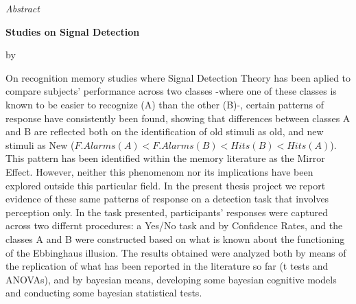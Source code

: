 \documentclass[
12pt, %
spanish, %
onehalfspacing, %
headsepline, %
]{MastersDoctoralThesis} %
\begin{document}
\cleardoublepage
\vspace*{0.15\textheight}
\begin{center}
	{\huge\textit{Abstract} \par}
	\bigskip
	\bigskip
	{\normalsize\bfseries Studies on Signal Detection \par} %
	\medskip
	{\normalsize by \authorname \par} %
	\bigskip
\end{center}
On recognition memory studies where Signal Detection Theory has been aplied to compare subjects' performance across two classes -where one of these classes is known to be easier to recognize (A) than the other (B)-, certain patterns of response have consistently been found, showing that differences between classes A and B are reflected both on the identification of old stimuli as old, and new stimuli as New ($F.Alarms(A) < F.Alarms (B) < Hits(B) < Hits(A)$). This pattern has been identified within the memory literature as the Mirror Effect. However, neither this phenomenom nor its implications have been explored outside this particular field. In the present thesis project we report evidence of these same patterns of response on a detection task that involves perception only. In the task presented, participants' responses were captured across two differnt procedures: a Yes/No task and by Confidence Rates, and the classes A and B were constructed based on what is known about the functioning of the Ebbinghaus illusion. The results obtained were analyzed both by means of the replication of what has been reported in the literature so far (t tests and ANOVAs), and by bayesian means, developing some bayesian cognitive models and conducting some bayesian statistical tests.\\

\end{document}
